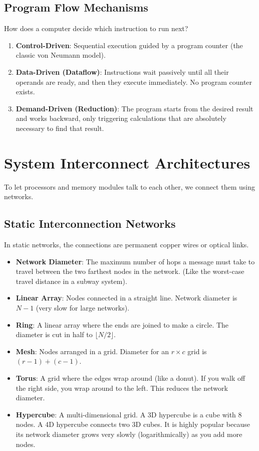 \documentclass[11pt,a4paper]{article}
\begin{document}
\subsection{Program Flow Mechanisms}
How does a computer decide which instruction to run next?
\begin{enumerate}
    \item \textbf{Control-Driven}: Sequential execution guided by a program counter (the classic von Neumann model).
    \item \textbf{Data-Driven (Dataflow)}: Instructions wait passively until all their operands are ready, and then they execute immediately. No program counter exists.
    \item \textbf{Demand-Driven (Reduction)}: The program starts from the desired result and works backward, only triggering calculations that are absolutely necessary to find that result.
\end{enumerate}

\section{System Interconnect Architectures}

To let processors and memory modules talk to each other, we connect them using networks.

\subsection{Static Interconnection Networks}
In static networks, the connections are permanent copper wires or optical links.
\begin{itemize}
    \item \textbf{Network Diameter}: The maximum number of hops a message must take to travel between the two farthest nodes in the network. (Like the worst-case travel distance in a subway system).
    \item \textbf{Linear Array}: Nodes connected in a straight line. Network diameter is $N-1$ (very slow for large networks).
    \item \textbf{Ring}: A linear array where the ends are joined to make a circle. The diameter is cut in half to $\lfloor N/2 \rfloor$.
    \item \textbf{Mesh}: Nodes arranged in a grid. Diameter for an $r \times c$ grid is $(r-1)+(c-1)$.
    \item \textbf{Torus}: A grid where the edges wrap around (like a donut). If you walk off the right side, you wrap around to the left. This reduces the network diameter.
    \item \textbf{Hypercube}: A multi-dimensional grid. A 3D hypercube is a cube with 8 nodes. A 4D hypercube connects two 3D cubes. It is highly popular because its network diameter grows very slowly (logarithmically) as you add more nodes.
\end{itemize}
\end{document}
